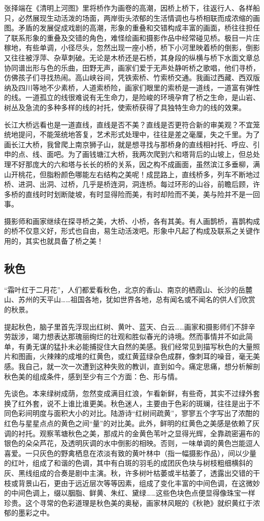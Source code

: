 \documentclass{article}
\begin{document}
张择端在《清明上河图》里将桥作为画卷的高潮，因桥上桥下，往返行人、各样船只，必然展现生动活泼的场面，两岸街头浓郁的生活情调也与桥相联而成浓缩的画图。矛盾的发展促成戏剧的高潮，形象的重叠和交错构成丰富的画面，桥往往担任了联系形象的重叠及交错的角色，难怪绘画和摄影作品中经常碰见桥。极目一片庄稼地，有些单调，小径尽头，忽然出现一座小桥，桥下小河里映着桥的倒影，倒影又往往被浮萍、杂草刺破。无论是木桥还是石桥，其身段的纵横与桥下水面文章总协同谱出形与色的乐曲，田野无声，画家们爱于无声处静听桥之歌唱，他们寻桥，仿佛孩子们寻找热闹。高山峡谷间，凭铁索桥、竹索桥交通。我画过西藏、西双版纳及四川等地不少素桥，人道索桥险，画家们眼里的索桥是一道线，一道富有弹性的线。一道孤立的线很难说有无生命力，是险峻的环境孕育了桥之生命，是山岩、树丛及急流的多种多样的线的衬托，使索桥获得了具独特生命力的线的效果。

长江大桥远看也是一道直线，直线是否不美？直线是否更符合新的审美观？不宜笼统地提问，不能笼统地答复，艺术形式处理中，往往是差之毫厘，失之千里。为了画长江大桥，我曾爬上南京狮子山，就是想寻找与那桥身的直线相衬托、呼应、引申的点、线、面吧。为了画钱塘江大桥，我两次爬到六和塔背后的山坡上，但总处理不好那庞大的六和塔与长长的桥的关系，因之构不成画面，虽然滨江多垂柳，满山开桃花，但脂粉颜色哪能左右结构之美呢！成昆路上，直线桥多，列车不断地过桥、进洞、出洞、过桥，几乎是桥连洞，洞连桥。每过环形的山谷，前瞻后顾，许多桥的直线时时划断陡坡，有时显得险而美，有时却险而不美，美与险并不是一回事。

摄影师和画家继续在探寻桥之美，大桥、小桥，各有其美。有人画鹊桥，喜鹊构成的桥不仅意义好，形式也自由，易生动活泼吧。形象中凡起了构成及联系之关键作用的，其实也就具备了桥之美！
\subsection{秋色}
“霜叶红于二月花”，人们都爱看秋色，北京的香山、南京的栖霞山、长沙的岳麓山、苏州的天平山……祖国各地，犹如世界各地，总有闻名或不闻名的供人们欣赏的秋景。

提起秋色，脑子里首先浮现出红树、黄叶、蓝天、白云……画家和摄影师们不辞辛劳跋涉，竭力想表达那瑰丽绚烂的壮观和胜似春光的诗境。然而事情并不如此简单，有勇无谋的猛扑未必能捕捉住大自然的美感。我们经常见到描写秋色的大量照片和图画，火辣辣的成堆的红黄色，或红黄蓝绿杂色成群，像刺耳的噪音，毫无美感。我自己，就一次一次遭到这种失败的教训，直到如今。痛定思痛，想分析解剖秋色美的组成条件，感到至少有三个方面：色、形与情。

先谈色。本来绿树成荫，忽然变成满目红浪，乍看新鲜，有些奇，其实不过绿外套换了红外套，说不上谁比谁更美。秋色迷人，主要由于色彩的斑斓，往往是出于不同色彩间明度与面积大小的对比。陆游诗“红树间疏黄”，寥寥五个字写出了浓酣的红色与星星点点的黄色之间“量”的对比美。此外，鲜明的红黄色之美感是依赖了灰调的衬托。观察苇塘秋色之美，那成片的金黄色苇叶之显得光辉，全靠疏密遍布的银色的朵朵芦花，及透明灰调的水中倒影的相映。否则，一味单调的黄色岂能逗人喜爱。一只灰色的野禽栖息在浓淡有致的黄叶林中（指一幅摄影作品），间以少量的红叶，组成了和谐的色调，其中有白斑的羽毛的成团灰色块与树枝粗细横斜的灰、黑线组成的合奏是剧中主演。秋，许多树叶枯萎或半枯萎了，透露出交错的干枝或背景山石，更由于远近层次等等因素，组成了变化丰富的中间色调，在这微妙的中间色调上，缀以胭脂、鲜黄、朱红、黛绿……这些色块色点便显得像珠宝一样珍贵。这个寻常的色彩道理是秋色美的奥秘，画家林风眠的《秋艳》就织黄红于浓郁的墨彩之中。
\end{document}
